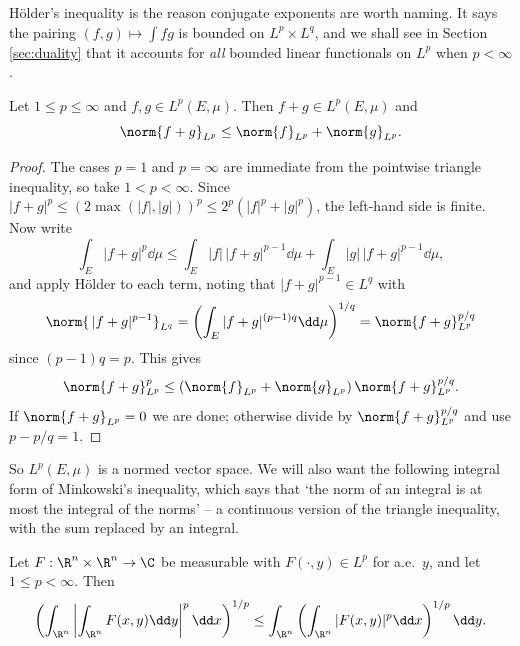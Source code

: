 H\"older's inequality is the reason conjugate exponents are worth naming. It says the pairing $(f,g) \mapsto \int fg$ is bounded on $L^p \times L^q$, and we shall see in Section \ref{sec:duality} that it accounts for \emph{all} bounded linear functionals on $L^p$ when $p < \infty$.

\begin{theorem}\label{aof-thm:minkowski}
	Let $1 \le p \le \infty$ and $f, g \in L^p(E,\mu)$. Then $f + g \in L^p(E,\mu)$ and
	$$\norm{f+g}_{L^p} \le \norm{f}_{L^p} + \norm{g}_{L^p}.$$
\end{theorem}

\begin{proof}
	The cases $p = 1$ and $p = \infty$ are immediate from the pointwise triangle inequality, so take $1 < p < \infty$. Since $|f+g|^p \le (2\max(|f|,|g|))^p \le 2^p(|f|^p + |g|^p)$, the left-hand side is finite. Now write
	$$\int_E |f+g|^p \dd\mu \le \int_E |f| \, |f+g|^{p-1} \dd \mu + \int_E |g|\, |f+g|^{p-1}\dd\mu,$$
	and apply H\"older to each term, noting that $|f+g|^{p-1} \in L^q$ with
	$$\norm{ \, |f+g|^{p-1}}_{L^q} = \left( \int_E |f+g|^{(p-1)q} \dd \mu\right)^{1/q} = \norm{f+g}_{L^p}^{p/q}$$
	since $(p-1)q = p$. This gives
	$$\norm{f+g}_{L^p}^p \le \left( \norm{f}_{L^p} + \norm{g}_{L^p}\right) \norm{f+g}_{L^p}^{p/q}.$$
	If $\norm{f+g}_{L^p} = 0$ we are done; otherwise divide by $\norm{f+g}_{L^p}^{p/q}$ and use $p - p/q = 1$.
\end{proof}

So $L^p(E,\mu)$ is a normed vector space. We will also want the following integral form of Minkowski's inequality, which says that `the norm of an integral is at most the integral of the norms' -- a continuous version of the triangle inequality, with the sum replaced by an integral.

\begin{lemma}\label{lem:minkint}
	Let $F : \R^n \times \R^n \to \C$ be measurable with $F(\cdot, y) \in L^p$ for a.e.\ $y$, and let $1 \le p < \infty$. Then
	$$\left( \int_{\R^n} \left| \int_{\R^n} F(x,y) \dd y \right|^p \dd x \right)^{1/p} \le \int_{\R^n} \left( \int_{\R^n} |F(x,y)|^p \dd x \right)^{1/p} \dd y.$$
\end{lemma}

